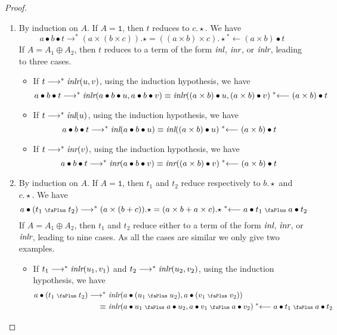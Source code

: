 \documentclass[screen, sigconf,authorversion,nonacm]{acmart}
\theoremstyle{acmdefinition}
\numberwithin{equation}{section}
\newcommand\inl{\mbox{\it inl}}
\newcommand\inr{\mbox{\it inr}}
\newcommand\inlr{\mbox{\it inlr}}
\newcommand\plus{\mathrel{\text{\normalfont\scalebox{0.7}{\faPlus}}}}
\newcommand\lra{\longrightarrow}
\newcommand\lras{\lra^*}
\newcommand\llas{\mathrel{{}^*{\longleftarrow}}}
\newcommand\one{\ensuremath{\mathtt 1}}
\begin{document}
\begin{proof}
\begin{enumerate}
    \item By induction on $A$.  If $A = \one$, then $t$ reduces to
      $c.\star$. We have
      $$a \bullet b \bullet t \lras (a \times (b \times c)).\star
      = ((a \times b) \times c).\star \llas (a \times b) \bullet t$$
      If $A = A_1 \oplus  A_2$, then $t$ reduces to
      a term of the form $\inl$, $\inr$, or $\inlr$, leading to three cases.
      \begin{itemize}

	\item If $t \lra^* \inlr(u,v)$, using
	  the induction hypothesis, we have
	  $$a \bullet b \bullet t \lras \inlr(a \bullet b \bullet u,a \bullet b
	  \bullet v) \equiv \inlr((a \times b) \bullet u,(a \times b) \bullet v)
	  \llas (a \times b) \bullet t$$

	\item If $t \lra^* \inl(u)$, using
	  the induction hypothesis, we have
	  $$a \bullet b \bullet t \lras \inl(a \bullet b \bullet u)
	  \equiv \inl((a \times b) \bullet u)
	  \llas (a \times b) \bullet t$$


	\item If $t \lra^* \inr(v)$, using
	  the induction hypothesis, we have
	  $$a \bullet b \bullet t \lras \inr(a \bullet b
	  \bullet v) \equiv \inr((a \times b) \bullet v)
	  \llas (a \times b) \bullet t$$
      \end{itemize}


    \item By induction on $A$.  If $A = \one$, then $t_1$ and $t_2$ reduce
      respectively to $b.\star$ and $c.\star$. We have
      $$a \bullet (t_1 \plus t_2) \lras (a \times (b + c)).\star
      = (a \times b + a \times c).\star \llas  a \bullet t_1 \plus a \bullet t_2$$
      If $A = A_1 \oplus  A_2$, then $t_1$ and $t_2$
      reduce either to a term of the form $\inl$, $\inr$, or $\inlr$, leading to nine cases.  As all the cases are similar we only give two examples.
      \begin{itemize}

	\item If $t_1 \lra^*
	  \inlr(u_1,v_1)$ and 
	  $t_2 \lra^* \inlr(u_2,v_2)$,
	  using the induction
	  hypothesis, we have
	  \begin{align*}
	    a \bullet (t_1 \plus t_2) \lras &\ \inlr(a \bullet (u_1 \plus u_2),a \bullet (v_1 \plus v_2))\\
	    \equiv &\ \inlr(a \bullet u_1 \plus a \bullet u_2,a \bullet v_1 \plus a \bullet v_2) \llas a \bullet t_1 \plus a \bullet t_2
	  \end{align*}


\end{itemize}
\end{enumerate}
\end{proof}
\end{document}
